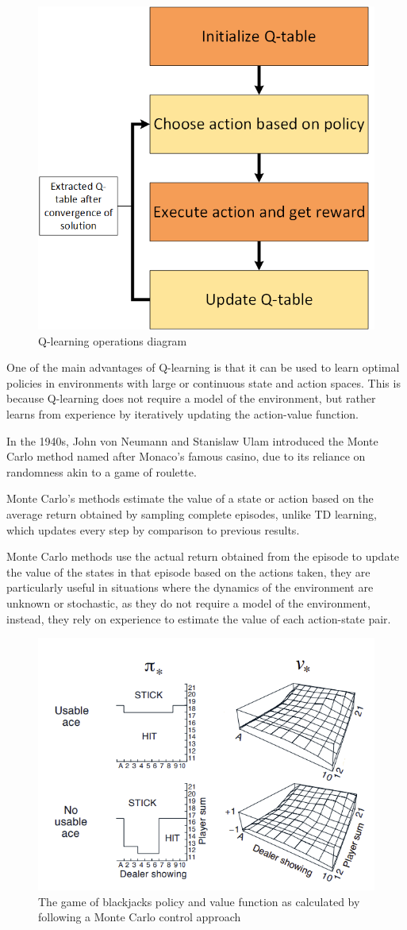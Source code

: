 \begin{figure}[!h]
    \centering
    \includegraphics[width=.5\textwidth]{fig/rl/Q-learning.png}
    \caption{Q-learning operations diagram}
    \label{fig:Q-learning}
\end{figure}

One of the main advantages of Q-learning is that it can be used to learn optimal policies in environments with large or continuous state and action spaces. This is because Q-learning does not require a model of the environment, but rather learns from experience by iteratively updating the action-value function.

In the 1940s, John von Neumann and Stanislaw Ulam introduced the Monte Carlo method named after Monaco's famous casino, due to its reliance on randomness akin to a game of roulette.

Monte Carlo's methods estimate the value of a state or action based on the average return obtained by sampling complete episodes, unlike TD learning, which updates every step by comparison to previous results.

Monte Carlo methods use the actual return obtained from the episode to update the value of the states in that episode based on the actions taken, they are particularly useful in situations where the dynamics of the environment are unknown or stochastic, as they do not require a model of the environment, instead, they rely on experience to estimate the value of each action-state pair.

\begin{figure}[!h]
    \centering
    \includegraphics[width=.7\textwidth]{fig/rl/Monte Carlo Blackjack convergence.png}
    \caption{The game of blackjacks policy and value function as calculated by following a Monte Carlo control approach}
    \label{fig:monte-carlo}
\end{figure}

